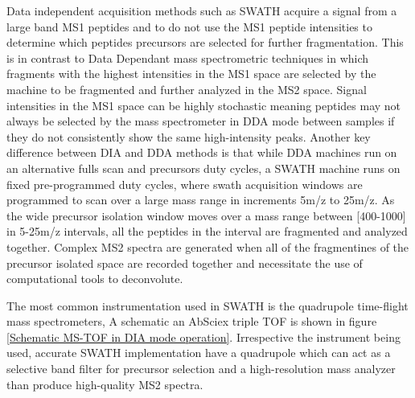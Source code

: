 \documentclass[a4paper,11pt,twoside]{book}
\begin{document}
	
    Data independent acquisition methods such as SWATH\citep{Gillet2012TargetedAnalysis} acquire a signal from a large band MS1 peptides and to do not use the MS1 peptide intensities to determine which peptides precursors are selected for further fragmentation\citep{Venable2004AutomatedSpectra}. This is in contrast to Data Dependant mass spectrometric techniques in which fragments with the highest intensities in the MS1 space are selected by the machine to be fragmented and further analyzed in the MS2 space. Signal intensities in the MS1 space can be highly stochastic meaning peptides may not always be selected by the mass spectrometer in DDA mode between samples if they do not consistently show the same high-intensity peaks. Another key difference between DIA and DDA methods is that while DDA machines run on an alternative fulls scan and precursors duty cycles, a SWATH machine runs on fixed pre-programmed duty cycles, where swath acquisition windows are programmed to scan over a large mass range in increments 5m/z to 25m/z\citep{Rost2017AutomatedChromatograms}. As the wide precursor isolation window moves over a mass range between [400-1000] in 5-25m/z intervals, all the peptides in the interval are fragmented and analyzed together. Complex MS2 spectra are generated when all of the fragmentines of the precursor isolated space are recorded together and necessitate the use of computational tools to deconvolute. 
	
    The most common instrumentation used in SWATH is the quadrupole time-flight mass spectrometers, A schematic an AbSciex triple TOF is shown in figure \ref{Schematic MS-TOF in DIA mode operation}. Irrespective the instrument being used, accurate SWATH implementation have a quadrupole which can act as a selective band filter for precursor selection and a high-resolution mass analyzer than produce high-quality MS2 spectra.
		
\end{document}
